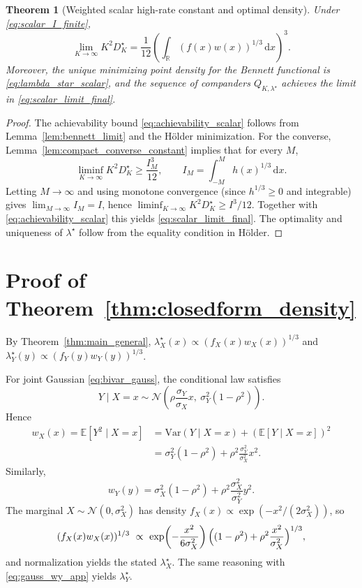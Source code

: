 \documentclass{article}
\newtheorem{theorem}{Theorem}
\newcommand{\E}{\mathbb{E}}
\newcommand{\R}{\mathbb{R}}
\newcommand{\dd}{\,\mathrm{d}}
\newcommand{\Var}{\mathrm{Var}}
\begin{document}
\begin{theorem}[Weighted scalar high-rate constant and optimal density]\label{thm:scalar_highrate}
Under \eqref{eq:scalar_I_finite},
\begin{equation}\label{eq:scalar_limit_final}
\lim_{K\to\infty} K^2 D_K^\star = \frac{1}{12}\left(\int_{\R} (f(x)w(x))^{1/3}\dd x\right)^3.
\end{equation}
Moreover, the unique minimizing point density for the Bennett functional is \eqref{eq:lambda_star_scalar}, and the sequence of companders $Q_{K,\lambda^\star}$ achieves the limit in \eqref{eq:scalar_limit_final}.
\end{theorem}
\begin{proof}
The achievability bound \eqref{eq:achievability_scalar} follows from Lemma~\ref{lem:bennett_limit} and the H\"older minimization.
For the converse, Lemma~\ref{lem:compact_converse_constant} implies that for every $M$,
\[
\liminf_{K\to\infty} K^2 D_K^\star \ge \frac{I_M^3}{12},
\qquad I_M=\int_{-M}^{M} h(x)^{1/3}\dd x.
\]
Letting $M\to\infty$ and using monotone convergence (since $h^{1/3}\ge 0$ and integrable) gives $\lim_{M\to\infty} I_M = I$, hence $\liminf_{K\to\infty}K^2 D_K^\star \ge I^3/12$. Together with \eqref{eq:achievability_scalar} this yields \eqref{eq:scalar_limit_final}. The optimality and uniqueness of $\lambda^\star$ follow from the equality condition in H\"older.
\end{proof}

\section{Proof of Theorem~\ref{thm:closedform_density}}\label{app:proof_closedform}
By Theorem~\ref{thm:main_general}, $\lambda_X^\star(x)\propto (f_X(x)w_X(x))^{1/3}$ and $\lambda_Y^\star(y)\propto (f_Y(y)w_Y(y))^{1/3}$.

For joint Gaussian \eqref{eq:bivar_gauss}, the conditional law satisfies
\[
Y\mid X=x \sim \mathcal{N}\!\left(\rho\frac{\sigma_Y}{\sigma_X}x,\ \sigma_Y^2(1-\rho^2)\right).
\]
Hence
\begin{align}
w_X(x)=\E[Y^2\mid X=x]
&=\Var(Y\mid X=x) + (\E[Y\mid X=x])^2 \nonumber\\
&=\sigma_Y^2(1-\rho^2)+\rho^2\frac{\sigma_Y^2}{\sigma_X^2}x^2. \label{eq:gauss_wx_app}
\end{align}
Similarly,
\begin{equation}\label{eq:gauss_wy_app}
w_Y(y)=\sigma_X^2(1-\rho^2)+\rho^2\frac{\sigma_X^2}{\sigma_Y^2}y^2.
\end{equation}
The marginal $X\sim\mathcal{N}(0,\sigma_X^2)$ has density $f_X(x)\propto \exp(-x^2/(2\sigma_X^2))$, so
\[
(f_X(x)w_X(x))^{1/3}\ \propto\ \exp\!\left(-\frac{x^2}{6\sigma_X^2}\right)\Bigl((1-\rho^2)+\rho^2\frac{x^2}{\sigma_X^2}\Bigr)^{1/3},
\]
and normalization yields the stated $\lambda_X^\star$. The same reasoning with \eqref{eq:gauss_wy_app} yields $\lambda_Y^\star$. \qedhere
\end{document}
